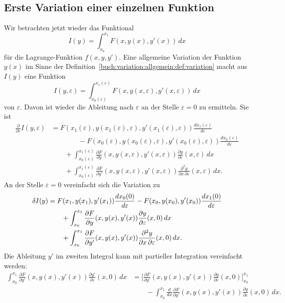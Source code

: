 \subsection{Erste Variation einer einzelnen Funktion
\label{buch:variation:allgemein:subsection:var1}}
Wir betrachten jetzt wieder das Funktional
\[
I(y)
=
\int_{x_0}^{x_1} F(x,y(x),y'(x)) \,dx
\]
für die Lagrange-Funktion $f(x,y,y')$.
Eine allgemeine Variation der Funktion $y(x)$ im Sinne der
Definition~\ref{buch:variation:allgemein:def:variation} macht aus
$I(y)$ eine Funktion 
\[
I(y,\varepsilon)
=
\int_{x_0(\varepsilon)}^{x_1(\varepsilon)}
F(x,y(x,\varepsilon),y'(x,\varepsilon))
\,dx
\]
von $\varepsilon$.
Davon ist wieder die Ableitung nach $\varepsilon$ an der Stelle
$\varepsilon=0$ zu ermitteln.
Sie ist
\begin{align*}
\frac{\partial}{\partial\varepsilon}I(y,\varepsilon)
&=
F(x_1(\varepsilon),y(x_1(\varepsilon),\varepsilon),
y'(x_1(\varepsilon),\varepsilon))
\frac{dx_1(\varepsilon)}{d\varepsilon}
\\
&\qquad\qquad
-
F(x_0(\varepsilon),y(x_0(\varepsilon),\varepsilon),
y'(x_0(\varepsilon),\varepsilon))
\frac{dx_0(\varepsilon)}{d\varepsilon}
\\
&\qquad
+
\int_{x_0(\varepsilon)}^{x_1(\varepsilon)}
\frac{\partial F}{\partial y}(x, y(x,\varepsilon), y'(x,\varepsilon))
\frac{\partial y}{\partial \varepsilon}(x,\varepsilon)
\,dx
\\
&\qquad
+
\int_{x_0(\varepsilon)}^{x_1(\varepsilon)}
\frac{\partial F}{\partial y'}(x, y(x,\varepsilon), y'(x,\varepsilon))
\frac{\partial^2 y}{\partial x\,\partial\varepsilon}(x,\varepsilon)
\,dx.
\end{align*}
An der Stelle $\varepsilon=0$ vereinfacht sich die Variation zu
\begin{align}
\delta I(y)
&=
F(x_1,y(x_1),y'(x_1))
\frac{dx_0(0)}{d\varepsilon}
-
F(x_0,y(x_0),y'(x_0))
\frac{dx_1(0)}{d\varepsilon}
\notag
\\
&\qquad
+
\int_{x_0}^{x_1}
\frac{\partial F}{\partial y}(x,y(x),y'(x))
\frac{\partial y}{\partial \varepsilon}(x,0)
\,dx
\notag
\\
&\qquad
+
\int_{x_0}^{x_1}
\frac{\partial F}{\partial y'}(x,y(x),y'(x))
\frac{\partial^2 y}{\partial x\,\partial\varepsilon}(x,0)
\,dx.
\label{buch:variation:allgemein:eqn:var1}
\end{align}
Die Ableitung $y'$ im zweiten Integral kann mit partieller Integration 
vereinfacht werden:
\begin{align*}
\int_{x_0}^{x_1}
\frac{\partial F}{\partial y'}(x,y(x),y'(x))
\frac{\partial y'}{\partial \varepsilon}(x,0)
\,dx
&=
\biggl[
\frac{\partial F}{\partial y'}(x,y(x),y'(x))
\frac{\partial y}{\partial\varepsilon}(x,0)
\biggr]_{x_0}^{x_1}
\\
&\qquad
-
\int_{x_0}^{x_1}
\frac{d}{dx}
\frac{\partial F}{\partial y'}(x,y(x),y'(x))
\frac{\partial y}{\partial\varepsilon}(x,0)
\,dx.
\end{align*}
